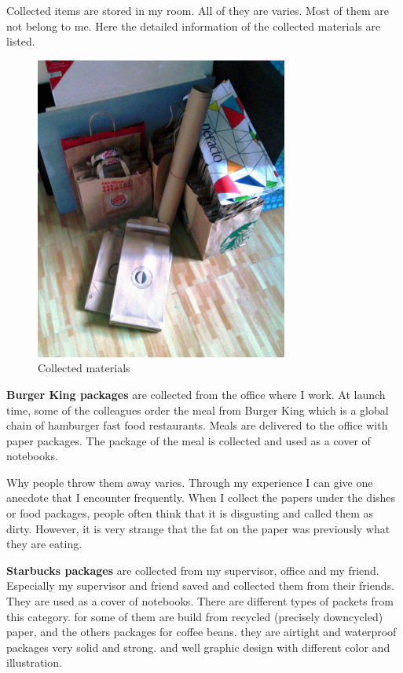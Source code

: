 Collected items are stored in my room. All of they are varies. Most of them are not belong to me. Here the detailed information of the collected materials are listed.

\begin{figure}[h!]
  \centering
  \includegraphics[height=10cm]{project_graphics/collected_all_together.jpg}
  \caption{Collected materials}
  \label{fig:CollectedAllTogether}
\end{figure}

\textbf{Burger King packages} are collected from the office where I work. At launch time, some of the colleagues order the meal from Burger King which is a global chain of hamburger fast food restaurants. Meals are delivered to the office with paper packages. The package of the meal is collected and used as a cover of notebooks. 


Why people throw them away varies. Through my experience I can give one anecdote that I encounter frequently. When I collect the papers under the dishes or food packages, people often think that it is disgusting and called them as dirty. However, it is very strange that the fat on the paper was previously what they are eating.

\textbf{Starbucks packages} are collected from my supervisor, office and my friend. Especially my supervisor and friend saved and collected them from their friends. They are used as a cover of notebooks. There are different types of packets from this category. for some of them are build from recycled (precisely downcycled) paper, and the others packages for coffee beans. they are airtight and waterproof packages very solid and strong. and well graphic design with different color and illustration.


